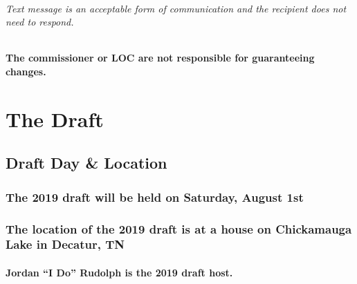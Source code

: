 \documentclass[]{book}
\let\oldsubparagraph\subparagraph
\renewcommand{\subparagraph}[1]{\oldsubparagraph{#1}\mbox{}}
\begin{document}
\hypertarget{text-message-is-an-acceptable-form-of-communication-and-the-recipient-does-not-need-to-respond.}{%
\subparagraph{Text message is an acceptable form of communication and the recipient does not need to respond.}\label{text-message-is-an-acceptable-form-of-communication-and-the-recipient-does-not-need-to-respond.}}

\hypertarget{the-commissioner-or-loc-are-not-responsible-for-guaranteeing-changes.}{%
\subsubsection{The commissioner or LOC are not responsible for guaranteeing changes.}\label{the-commissioner-or-loc-are-not-responsible-for-guaranteeing-changes.}}

\hypertarget{the-draft}{%
\chapter{The Draft}\label{the-draft}}

\hypertarget{draft-day-location}{%
\section{Draft Day \& Location}\label{draft-day-location}}

\hypertarget{the-2019-draft-will-be-held-on-saturday-august-1st}{%
\subsection{The 2019 draft will be held on Saturday, August 1st}\label{the-2019-draft-will-be-held-on-saturday-august-1st}}

\hypertarget{the-location-of-the-2019-draft-is-at-a-house-on-chickamauga-lake-in-decatur-tn}{%
\subsection{The location of the 2019 draft is at a house on Chickamauga Lake in Decatur, TN}\label{the-location-of-the-2019-draft-is-at-a-house-on-chickamauga-lake-in-decatur-tn}}

\hypertarget{jordan-i-do-rudolph-is-the-2019-draft-host.}{%
\subsubsection{Jordan ``I Do'' Rudolph is the 2019 draft host.}\label{jordan-i-do-rudolph-is-the-2019-draft-host.}}
\end{document}
